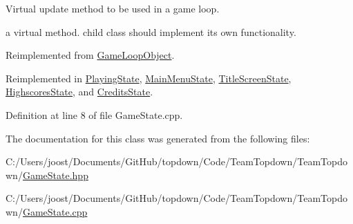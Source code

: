 Virtual update method to be used in a game loop. 

a virtual method. child class should implement its own functionality. 

Reimplemented from \hyperlink{class_game_loop_object_ae36a15981f1dd3f3bea6050473490349}{Game\+Loop\+Object}.



Reimplemented in \hyperlink{class_playing_state_afb7ccd732dfaad4397b5096876092136}{Playing\+State}, \hyperlink{class_main_menu_state_a35ec35095919057ef7373906b09a9d30}{Main\+Menu\+State}, \hyperlink{class_title_screen_state_a0db8d35f9d3013155d2e61939d2a47ea}{Title\+Screen\+State}, \hyperlink{class_highscores_state_a8a55079503b5bdaf205e74eb9d48dae0}{Highscores\+State}, and \hyperlink{class_credits_state_a565adc4ac454f23941c5db684da56ad7}{Credits\+State}.



Definition at line 8 of file Game\+State.\+cpp.



The documentation for this class was generated from the following files\+:\begin{DoxyCompactItemize}
\item 
C\+:/\+Users/joost/\+Documents/\+Git\+Hub/topdown/\+Code/\+Team\+Topdown/\+Team\+Topdown/\hyperlink{_game_state_8hpp}{Game\+State.\+hpp}\item 
C\+:/\+Users/joost/\+Documents/\+Git\+Hub/topdown/\+Code/\+Team\+Topdown/\+Team\+Topdown/\hyperlink{_game_state_8cpp}{Game\+State.\+cpp}\end{DoxyCompactItemize}
